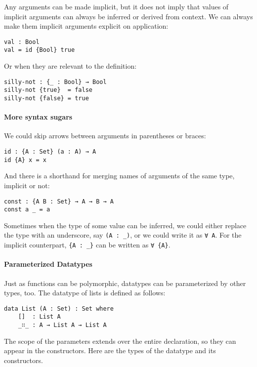 \documentclass[../thesis.tex]{subfiles}
\begin{document}
Any arguments can be made implicit, but it does not imply that values of
implicit arguments can always be inferred or derived from context. We can always
make them implicit arguments explicit on application:

\begin{lstlisting}
val : Bool
val = id {Bool} true
\end{lstlisting}

Or when they are relevant to the definition:

\begin{lstlisting}
silly-not : {_ : Bool} → Bool
silly-not {true}  = false
silly-not {false} = true
\end{lstlisting}

\paragraph{More syntax sugars}
We could skip arrows between arguments in parentheses or braces:

\begin{lstlisting}
id : {A : Set} (a : A) → A
id {A} x = x
\end{lstlisting}

And there is a shorthand for merging names of arguments of the same type, implicit or not:

\begin{lstlisting}
const : {A B : Set} → A → B → A
const a _ = a
\end{lstlisting}

Sometimes when the type of some value can be inferred, we could either replace
the type with an underscore, say {\lstinline|(A : _)|}, or we could write it as
{\lstinline|∀ A|}. For the implicit counterpart, {\lstinline|{A : _}|} can be
written as {\lstinline|∀ {A}|}.

\paragraph{Parameterized Datatypes}

Just as functions can be polymorphic, datatypes can be parameterized by other
types, too. The datatype of lists is defined as follows:

\begin{lstlisting}
data List (A : Set) : Set where
    []  : List A
    _∷_ : A → List A → List A
\end{lstlisting}

The scope of the parameters extends over the entire declaration, so they can
appear in the constructors.
Here are the types of the datatype and its constructors.
\end{document}
